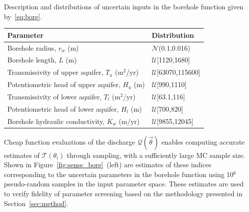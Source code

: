 \begin{table}[ht]
\renewcommand*{\arraystretch}{1.2}
\caption{Description and distributions of uncertain inputs in the borehole function
given by~\eqref{eq:bore}.}
\label{tab:bore}
\end{table}
\begin{center}
\begin{tabular}{ll}
\toprule
\textbf{Parameter} & \textbf{Distribution} \\ 
\bottomrule
Borehole radius, $r_w$ (m) & $\mathcal{N}$(0.1,0.016) \\
Borehole length, $L$ (m) & $\mathcal{U}$[1120,1680] \\
Transmissivity of upper aquifer, $T_u$ (m$^2$/yr) & $\mathcal{U}$[63070,115600] \\
Potentiometric head of upper aquifer, $H_u$ (m) & $\mathcal{U}$[990,1110] \\
Transmissivity of lower aquifer, $T_l$ (m$^2$/yr) & $\mathcal{U}$[63.1,116] \\
Potentiometric head of lower aquifer, $H_l$ (m) & $\mathcal{U}$[700,820] \\
Borehole hydraulic conductivity, $K_w$ (m/yr) & $\mathcal{U}$[9855,12045] \\
\bottomrule
\end{tabular}
\end{center}

%
Cheap function evaluations of the discharge $\mathcal{Q}(\vec{\theta})$ 
enables computing accurate estimates of $\mathcal{T}(\theta_i)$ through
sampling, with a sufficiently large MC sample size.  Shown in
Figure~\ref{fig:sense_bore}~(left) are estimates of these indices corresponding to the
uncertain parameters in the borehole function using 10$^6$ pseudo-random
samples in the input parameter space. 
These estimates are used to verify fidelity of
parameter screening based on the methodology presented in Section~\ref{sec:method}. 

